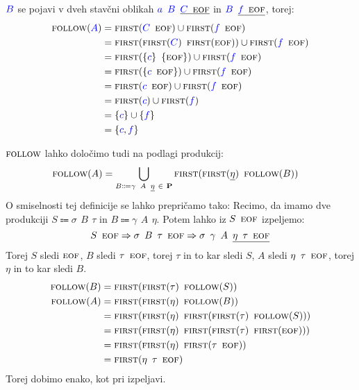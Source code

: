 \documentclass{article}
\newcommand{\FIRST}{\textsc{first}}
\newcommand{\FOLLOW}{\textsc{follow}}
\newcommand{\EOF}{\textsc{eof}}
\newcommand{\Set}[1]{\mathbf{#1}}
\newcommand{\Symbol}[1]{\textcolor{blue}{#1}}
\newcommand{\Productions}{\Set{P}}
\newcommand{\Arrow}{\Coloneq}
\newcommand{\Derive}{\Rightarrow}
\newcommand{\Seq}{{\ \,}}
\begin{document}
$\Symbol{B}$ se pojavi v dveh stavčni oblikah $\Symbol{a} \Seq \Symbol{B} \Seq \underline{\Symbol{C} \Seq \EOF}$ in $\Symbol{B} \Seq \underline{\Symbol{f} \Seq \EOF}$, torej:
\begin{align*}
  \FOLLOW(\Symbol{A}) &= \FIRST(\Symbol{C} \Seq \EOF) \cup \FIRST(\Symbol{f} \Seq \EOF)\\
             &= \FIRST(\FIRST(\Symbol{C}) \Seq \FIRST(\EOF)) \cup \FIRST(\Symbol{f} \Seq \EOF)\\
             &= \FIRST(\{\Symbol{c}\} \Seq \{\EOF\}) \cup \FIRST(\Symbol{f} \Seq \EOF)\\
             &= \FIRST(\{\Symbol{c} \Seq \EOF\}) \cup \FIRST(\Symbol{f} \Seq \EOF)\\
             &= \FIRST(\Symbol{c} \Seq \EOF) \cup \FIRST(\Symbol{f} \Seq \EOF)\\
             &= \FIRST(\Symbol{c}) \cup \FIRST(\Symbol{f})\\
             &= \{\Symbol{c}\} \cup \{\Symbol{f}\}\\
             &= \{\Symbol{c}, \Symbol{f}\}
\end{align*}

$\FOLLOW$ lahko določimo tudi na podlagi produkcij:
\begin{align*}
  \FOLLOW(A) &= \bigcup_{B \Arrow \gamma \Seq A \Seq \underline{\eta}\ \in\ \Productions} \FIRST(\FIRST(\underline{\eta}) \Seq \FOLLOW(B))
\end{align*}
O smiselnosti tej definicije se lahko prepričamo tako:
Recimo, da imamo dve produkciji $S \Arrow \sigma \Seq B \Seq \tau$ in $B \Arrow \gamma \Seq A \Seq \eta$.
Potem lahko iz $S \Seq \EOF$ izpeljemo:
\begin{equation*}
  S \Seq \EOF \Derive \sigma \Seq B \Seq \tau \Seq \EOF \Derive \sigma \Seq \gamma \Seq A \Seq \underline{\eta \Seq \tau \Seq \EOF}
\end{equation*}
Torej $S$ sledi $\EOF$, $B$ sledi $\tau \Seq \EOF$, torej $\tau$ in to kar sledi $S$, $A$ sledi $\eta \Seq \tau \Seq \EOF$, torej $\eta$ in to kar sledi $B$.
\begin{align*}
  \FOLLOW(B) &= \FIRST(\FIRST(\tau) \Seq \FOLLOW(S))\\
  \FOLLOW(A) &= \FIRST(\FIRST(\eta) \Seq \FOLLOW(B))\\
   &= \FIRST(\FIRST(\eta) \Seq \FIRST(\FIRST(\tau) \Seq \FOLLOW(S)))\\
   &= \FIRST(\FIRST(\eta) \Seq \FIRST(\FIRST(\tau) \Seq \FIRST(\EOF)))\\
   &= \FIRST(\FIRST(\eta) \Seq \FIRST(\tau \Seq \EOF))\\
   &= \FIRST(\eta \Seq \tau \Seq \EOF)
\end{align*}
Torej dobimo enako, kot pri izpeljavi.
\end{document}
